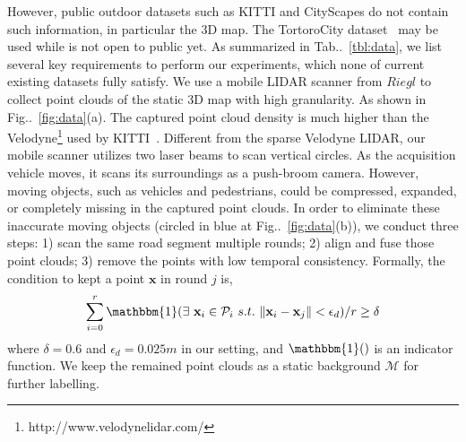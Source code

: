 \documentclass[10pt,twocolumn,letterpaper]{article}
\makeatletter
\newcommand{\figref}[1]{Fig\onedot~\ref{#1}}
\newcommand{\tabref}[1]{Tab\onedot~\ref{#1}}
\newcommand{\ve}[1]{{\mathbf #1}} %
\newcommand{\hua}[1]{{\mathcal #1}}
\DeclareRobustCommand\onedot{\futurelet\@let@token\@onedot}
\def\onedot{\ifx\@let@token.\else.\null\fi\xspace}
\makeatother
\begin{document}
However, public outdoor datasets such as KITTI and CityScapes do not contain such information, in particular the 3D map. The TortoroCity dataset~\cite{wang2016torontocity} may be used while is not open to public yet. As summarized in \tabref{tbl:data}, we list several key requirements to perform our experiments, which none of current existing datasets fully satisfy.  
We use a mobile LIDAR scanner from $Riegl$ to collect point clouds of the static 3D map with high granularity. As shown in \figref{fig:data}(a). The captured point cloud density is much higher than the Velodyne\footnote{http://www.velodynelidar.com/} used by KITTI~\cite{geiger2012we}.
Different from the sparse Velodyne LIDAR, our mobile scanner utilizes two laser beams to scan vertical circles. As the acquisition vehicle moves, it scans its surroundings as a push-broom camera. However, moving objects, such as vehicles and pedestrians, could be compressed, expanded, or completely missing in the captured point clouds.
In order to eliminate these inaccurate moving objects (circled in blue at \figref{fig:data}(b)), we conduct three steps:
1) scan the same road segment multiple rounds; 2) align and fuse those point clouds; 3) remove the points with low temporal consistency.
Formally, the condition to kept a point $\ve{x}$ in round $j$ is,
{\vspace{-0.5\baselineskip}
\begin{align}
\sum_{i=0}^{r}{\mathbbm{1}(\exists~\ve{x}_i \in \hua{P}_i~s.t.~\|\ve{x}_i - \ve{x}_j\| < \epsilon_d )} / r \geq \delta
\end{align}
}
where $\delta = 0.6$ and $\epsilon_d = 0.025m$ in our setting, and $\mathbbm{1}()$ is an indicator function. 
We keep the remained point clouds as a static background $\hua{M}$ for further labelling.
\end{document}
